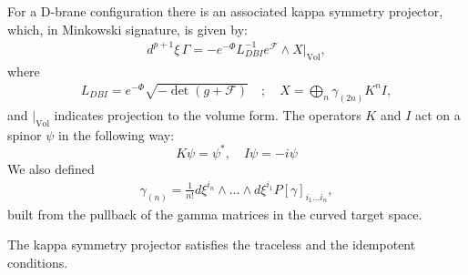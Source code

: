For a D-brane configuration there is an associated kappa symmetry projector, which, in Minkowski signature, is given by\cite{Skenderis:2002vf}:
\begin{align}
d^{p+1} \xi \, \Gamma = - e^{-\Phi} L_{DBI}^{-1} e^{\mathcal{F}}\wedge X|_{\text{Vol}},
\end{align}
where
\begin{align}
L_{DBI}= e^{-\Phi} \sqrt{-\det  (g+\mathcal{F})}\quad;
\quad
X = \bigoplus_n \gamma_{(2n)} K^n I,
\end{align}
and $|_{\text{Vol}}$ indicates projection to the volume form.
The operators $K$ and $I$ act on a spinor $\psi$ in the following way:
\begin{equation}
 K \psi = \psi^* , \quad I \psi = -i \psi
\end{equation}
We also defined
\begin{align}
\gamma_{(n)} = \frac{1}{n !}d\xi^{i_n}\wedge ... \wedge d\xi^{i_1} P[\gamma]_{i_1...i_n},
\end{align}
built from the pullback of the gamma matrices in the curved target space.

The kappa symmetry projector satisfies the traceless and the idempotent conditions.

